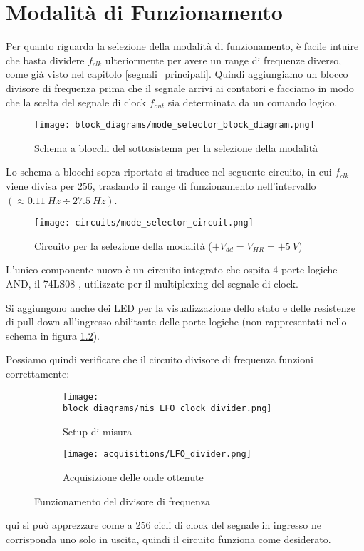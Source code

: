 \chapter{Modalità di Funzionamento}


Per quanto riguarda la selezione della modalità di funzionamento, è facile intuire che basta
dividere $f_{clk}$ ulteriormente per avere un range di frequenze diverso, come già visto nel
capitolo \ref{segnali_principali}. Quindi aggiungiamo un blocco divisore di frequenza prima
che il segnale arrivi ai contatori e facciamo in modo che la scelta del segnale di clock
$f_{out}$ sia determinata da un comando logico.

\begin{figure}[H]
    \centering
    \texttt{[image: block\_diagrams/mode\_selector\_block\_diagram.png]}
    \caption{Schema a blocchi del sottosistema per la selezione della modalità}
    \label{mode_selector_block_diagram}
\end{figure}

Lo schema a blocchi sopra riportato si traduce nel seguente circuito, in cui $f_{clk}$
viene divisa per $256$, traslando il range di funzionamento nell'intervallo
$(\approx0.11\ Hz\div27.5\ Hz)$.

\begin{figure}[H]
    \centering
    \texttt{[image: circuits/mode\_selector\_circuit.png]}
    \caption{Circuito per la selezione della modalità ($+V_{dd}=V_{HR}=+5\ V$)}
    \label{mode_selector_circuit}
\end{figure}

L'unico componente nuovo è un circuito integrato che ospita 4 porte logiche AND, il 74LS08
\cite{74ls08}, utilizzate per il multiplexing del segnale di clock.

Si aggiungono anche dei LED per la visualizzazione dello stato e delle resistenze di pull-down
all'ingresso abilitante delle porte logiche (non rappresentati nello schema in figura
\ref{mode_selector_circuit}).

Possiamo quindi verificare che il circuito divisore di frequenza funzioni correttamente:

\begin{figure}[H]
    \centering

    \begin{subfigure}{.5\textwidth}
        \centering
        \texttt{[image: block\_diagrams/mis\_LFO\_clock\_divider.png]}
        \caption{Setup di misura}
        \label{mis_LFO_clock_divider}
    \end{subfigure}%
    \begin{subfigure}{.5\textwidth}
        \centering
        \texttt{[image: acquisitions/LFO\_divider.png]}
        \caption{Acquisizione delle onde ottenute}
        \label{LFO_divider}
    \end{subfigure}

    \caption{Funzionamento del divisore di frequenza}
    \label{freq_divider}
\end{figure}

qui si può apprezzare come a 256 cicli di clock del segnale in ingresso ne corrisponda uno
solo in uscita, quindi il circuito funziona come desiderato.

